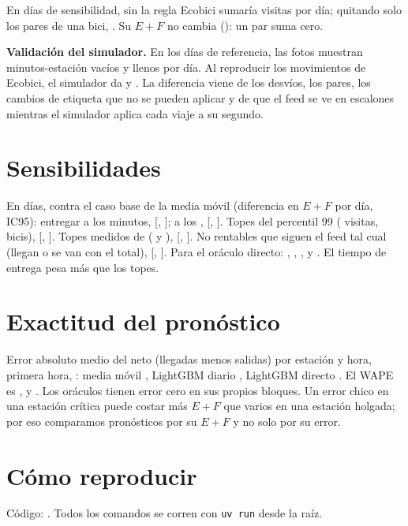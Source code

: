 \documentclass[conference,letterpaper,10pt]{IEEEtran}
\newcommand{\EF}{E+F}
\begin{document}
En \rcurvaDias{} días de sensibilidad, sin la regla Ecobici sumaría \rsSinRegla{} visitas por día; quitando solo los pares de una bici, \rsSoloUno. Su $\EF$ no cambia (\rsEcoEF): un par suma cero.

\textbf{Validación del simulador.} En los \rrefDias{} días de referencia, las fotos muestran \rvEobs{} minutos-estación vacíos y \rvFobs{} llenos por día. Al reproducir los movimientos de Ecobici, el simulador da \rvErep{} y \rvFrep. La diferencia viene de los desvíos, los pares, los cambios de etiqueta que no se pueden aplicar y de que el feed se ve en escalones mientras el simulador aplica cada viaje a su segundo.

\section{Sensibilidades}\label{ap:sens}
En \rcurvaDias{} días, contra el caso base de la media móvil (diferencia en $\EF$ por día, IC95): entregar a los \rentregaCorta{} minutos, \rsCuarenta{} [\rsCuarentaLo, \rsCuarentaHi]; a los \rentregaLarga, \rsSetenta{} [\rsSetentaLo, \rsSetentaHi]. Topes del percentil 99 (\rtopeVisNN{} visitas, \rtopeBicisNN{} bicis), \rsNN{} [\rsNNLo, \rsNNHi]. Topes medidos de \rantPeriodo{} (\rtopeVisAnt{} y \rtopeBicisAnt), \rsAnt{} [\rsAntLo, \rsAntHi]. No rentables que siguen el feed tal cual (llegan o se van con el total), \rsDan{} [\rsDanLo, \rsDanHi]. Para el oráculo directo: \rsCuarentaOr, \rsSetentaOr, \rsNNOr, \rsAntOr{} y \rsDanOr. El tiempo de entrega pesa más que los topes.

\section{Exactitud del pronóstico}\label{ap:pron}
Error absoluto medio del neto (llegadas menos salidas) por estación y hora, primera hora, \rmaeMes: media móvil \rmaeMa, LightGBM diario \rmaeLgbmD, LightGBM directo \rmaeLgbmDir. El WAPE es \rmaeMaW, \rmaeLgbmDW{} y \rmaeLgbmDirW. Los oráculos tienen error cero en sus propios bloques. Un error chico en una estación crítica puede costar más $\EF$ que varios en una estación holgada; por eso comparamos pronósticos por su $\EF$ y no solo por su error.

\section{Cómo reproducir}\label{ap:repro}
Código: \cite{repo}. Todos los comandos se corren con \texttt{uv run} desde la raíz.
\end{document}
